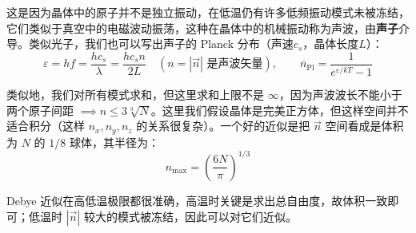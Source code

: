 这是因为晶体中的原子并不是独立振动，在低温仍有许多低频振动模式未被冻结，它们类似于真空中的电磁波动振荡，这种在晶体中的机械振动称为声波，由\textbf{声子}介导。类似光子，我们也可以写出声子的 Planck 分布（声速$c_s$，晶体长度$L$）：
\begin{equation}
    \varepsilon=hf=\frac{hc_s}{\lambda}=\frac{hc_sn}{2L}\quad (n=|\vec n|\text{ 是声波矢量}),
    \qquad
    \overline n_{\mathrm{Pl}}=\frac{1}{e^{\varepsilon/kT}-1}
\end{equation}

类似地，我们对所有模式求和，但这里求和上限不是 $\infty$，因为声波波长不能小于两个原子间距 $\implies n\le 3\sqrt[3]{N}$。这里我们假设晶体是完美正方体，但这样空间并不适合积分（这样 $n_x,n_y,n_z$ 的关系很复杂）。一个好的近似是把 $\vec n$ 空间看成是体积为 $N$ 的 $1/8$ 球体，其半径为：
\begin{equation}
    n_{\max}=\left(\frac{6N}{\pi}\right)^{1/3}
\end{equation}

Debye 近似在高低温极限都很准确，高温时关键是求出总自由度，故体积一致即可；低温时 $|\vec n|$ 较大的模式被冻结，因此可以对它们近似。

